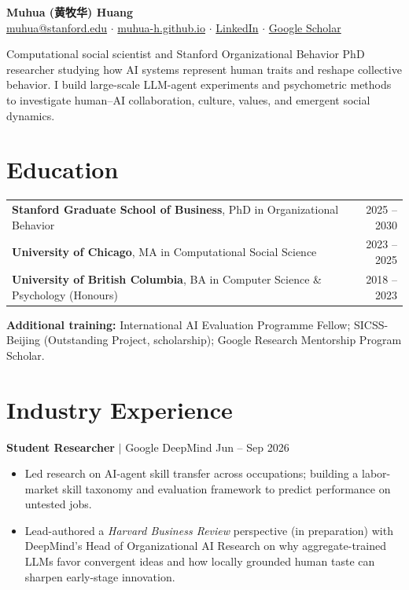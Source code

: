 \documentclass[10pt,letterpaper]{article}
\newcommand{\entry}[3]{%
  \par\addvspace{0.35em}%
  \noindent\textbf{#1} $|$ #2 \hfill #3\par\nobreak
}
\begin{document}
\begin{center}
  {\LARGE\bfseries Muhua (黄牧华) Huang}\\[0.25em]
  {\small
  \href{mailto:muhua@stanford.edu}{muhua@stanford.edu}
  \quad$\cdot$\quad
  \href{https://muhua-h.github.io/}{muhua-h.github.io}
  \quad$\cdot$\quad
  \href{https://www.linkedin.com/in/muhua-huang-0311a2177}{LinkedIn}
  \quad$\cdot$\quad
  \href{https://scholar.google.com/citations?user=JxIbPdoAAAAJ}{Google Scholar}}
\end{center}

\vspace{-0.45em}

\begin{summarybox}
\small
Computational social scientist and Stanford Organizational Behavior PhD researcher studying how AI systems represent human traits and reshape collective behavior. I build large-scale LLM-agent experiments and psychometric methods to investigate human--AI collaboration, culture, values, and emergent social dynamics.
\end{summarybox}

\section*{Education}

\renewcommand{\arraystretch}{1.08}
\begin{tabularx}{\textwidth}{Xr}
\textbf{Stanford Graduate School of Business}, PhD in Organizational Behavior & 2025 -- 2030 \\
\textbf{University of Chicago}, MA in Computational Social Science & 2023 -- 2025 \\
\textbf{University of British Columbia}, BA in Computer Science \& Psychology (Honours) & 2018 -- 2023
\end{tabularx}
\renewcommand{\arraystretch}{1}

\vspace{0.1em}
{\small\noindent\textbf{Additional training:} International AI Evaluation Programme Fellow; SICSS-Beijing (Outstanding Project, scholarship); Google Research Mentorship Program Scholar.}

\section*{Industry Experience}

\entry{Student Researcher}{Google DeepMind}{Jun -- Sep 2026}
\begin{itemize}
  \item Led research on AI-agent skill transfer across occupations; building a labor-market skill taxonomy and evaluation framework to predict performance on untested jobs.
  \item Lead-authored a \textit{Harvard Business Review} perspective (in preparation) with DeepMind's Head of Organizational AI Research on why aggregate-trained LLMs favor convergent ideas and how locally grounded human taste can sharpen early-stage innovation.
\end{itemize}
\end{document}
